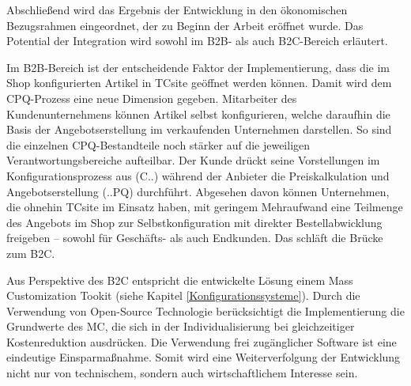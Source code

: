 \documentclass[11pt, a4paper, titlepage, listof=totoc, bibliography=totoc, index=totoc, twoside, openright, headings=normal]{scrreprt}
\begin{document}
Abschließend wird das Ergebnis der Entwicklung in den ökonomischen Bezugsrahmen eingeordnet, der zu Beginn der Arbeit eröffnet wurde. Das Potential der Integration wird sowohl im B2B- als auch B2C-Bereich erläutert.

Im B2B-Bereich ist der entscheidende Faktor der Implementierung, dass die im Shop konfigurierten Artikel in TCsite geöffnet werden können. Damit wird dem CPQ-Prozess eine neue Dimension gegeben. Mitarbeiter des Kundenunternehmens können Artikel selbst konfigurieren, welche daraufhin die Basis der Angebotserstellung im verkaufenden Unternehmen darstellen. So sind die einzelnen CPQ-Bestandteile noch stärker auf die jeweiligen Verantwortungsbereiche aufteilbar. Der Kunde drückt seine Vorstellungen im Konfigurationsprozess aus (C..) während der Anbieter die Preiskalkulation und Angebotserstellung (..PQ) durchführt. Abgesehen davon können Unternehmen, die ohnehin TCsite im Einsatz haben, mit geringem Mehraufwand eine Teilmenge des Angebots im Shop zur Selbstkonfiguration mit direkter Bestellabwicklung freigeben -- sowohl für Geschäfts- als auch Endkunden. Das schläft die Brücke zum B2C.

Aus Perspektive des B2C entspricht die entwickelte Lösung einem \glqq Mass Customization Tookit\grqq{} (siehe Kapitel \ref{Konfigurationssysteme}). Durch die Verwendung von Open-Source Technologie berücksichtigt die Implementierung die Grundwerte des \ac{MC}, die sich in der Individualisierung bei gleichzeitiger Kostenreduktion ausdrücken. Die Verwendung frei zugänglicher Software ist eine eindeutige Einsparmaßnahme. Somit wird eine Weiterverfolgung der Entwicklung nicht nur von technischem, sondern auch wirtschaftlichem Interesse sein.

\pagebreak






\end{document}
